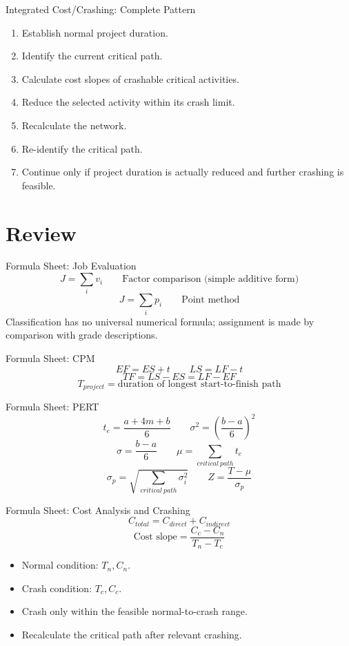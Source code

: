 \documentclass[aspectratio=169,10pt]{beamer}
\begin{document}
\begin{frame}{Integrated Cost/Crashing: Complete Pattern}
\begin{enumerate}
  \item Establish normal project duration.
  \item Identify the current critical path.
  \item Calculate cost slopes of crashable critical activities.
  \item Reduce the selected activity within its crash limit.
  \item Recalculate the network.
  \item Re-identify the critical path.
  \item Continue only if project duration is actually reduced and further crashing is feasible.
\end{enumerate}
\end{frame}

\section{Review}



\begin{frame}{Formula Sheet: Job Evaluation}
\[
\boxed{J=\sum_i v_i}
\qquad\text{Factor comparison (simple additive form)}
\]
\[
\boxed{J=\sum_i p_i}
\qquad\text{Point method}
\]
Classification has no universal numerical formula; assignment is made by comparison with grade descriptions.
\end{frame}

\begin{frame}{Formula Sheet: CPM}
\[
\boxed{EF=ES+t}
\qquad
\boxed{LS=LF-t}
\]
\[
\boxed{TF=LS-ES=LF-EF}
\]
\[
\boxed{T_{project}=\text{duration of longest start-to-finish path}}
\]
\end{frame}

\begin{frame}{Formula Sheet: PERT}
\[
\boxed{t_e=\frac{a+4m+b}{6}}
\qquad
\boxed{\sigma^2=\left(\frac{b-a}{6}\right)^2}
\]
\[
\boxed{\sigma=\frac{b-a}{6}}
\qquad
\boxed{\mu=\sum_{critical\ path}t_e}
\]
\[
\boxed{\sigma_p=\sqrt{\sum_{critical\ path}\sigma_i^2}}
\qquad
\boxed{Z=\frac{T-\mu}{\sigma_p}}
\]
\end{frame}

\begin{frame}{Formula Sheet: Cost Analysis and Crashing}
\[
\boxed{C_{total}=C_{direct}+C_{indirect}}
\]
\[
\boxed{\text{Cost slope}=\frac{C_c-C_n}{T_n-T_c}}
\]
\begin{itemize}
  \item Normal condition: $T_n,C_n$.
  \item Crash condition: $T_c,C_c$.
  \item Crash only within the feasible normal-to-crash range.
  \item Recalculate the critical path after relevant crashing.
\end{itemize}
\end{frame}
\end{document}
